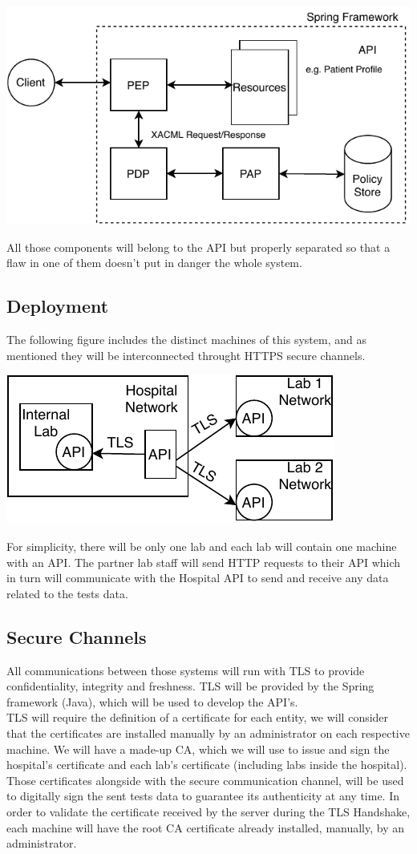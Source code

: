 	\includegraphics[width=.6\textwidth]{figs/access_control.pdf}


All those components will belong to the API but properly separated so that a flaw in one of them doesn't put in danger the whole system.

\subsection{Deployment}
The following figure includes the distinct machines of this system, and as mentioned they will be interconnected throught HTTPS secure channels.

	\includegraphics[width=.4\textwidth]{figs/infrastructure.pdf}

For simplicity, there will be only one lab and each lab will contain one machine with an API. The partner lab staff will send HTTP requests to their API which in turn will communicate with the Hospital API to send and receive any data related to the tests data.

\subsection{Secure Channels}

All communications between those systems will run with TLS to provide confidentiality, integrity and freshness. TLS will be provided by the Spring framework (Java), which will be used to develop the API's. \\
	
TLS will require the definition of a certificate for each entity, we will consider that the certificates are installed manually by an administrator on each respective machine.
We will have a made-up CA, which we will use to issue and sign the hospital's certificate and each lab's certificate (including labs inside the hospital). Those certificates alongside with the secure communication channel, will be used to digitally sign the sent tests data to guarantee its authenticity at any time.
In order to validate the certificate received by the server during the TLS Handshake, each machine will have the root CA certificate already installed, manually, by an administrator.\\ 

